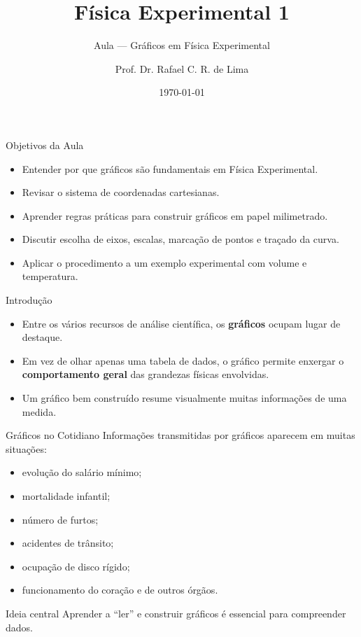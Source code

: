 \documentclass[aspectratio=169]{beamer}
\title[FEX1]{Física Experimental 1}
\subtitle{Aula --- Gráficos em Física Experimental}
\author{Prof. Dr. Rafael C. R. de Lima}
\institute{UDESC --- CCT}
\date{\today}
\begin{document}
\begin{frame}
\titlepage
\end{frame}

\begin{frame}{Objetivos da Aula}
\begin{itemize}
\item Entender por que gráficos são fundamentais em Física Experimental.
\item Revisar o sistema de coordenadas cartesianas.
\item Aprender regras práticas para construir gráficos em papel milimetrado.
\item Discutir escolha de eixos, escalas, marcação de pontos e traçado da curva.
\item Aplicar o procedimento a um exemplo experimental com volume e temperatura.
\end{itemize}
\end{frame}

\begin{frame}{Introdução}
\begin{itemize}
\item Entre os vários recursos de análise científica, os \textbf{gráficos} ocupam lugar de destaque.
\item Em vez de olhar apenas uma tabela de dados, o gráfico permite enxergar o
\textbf{comportamento geral} das grandezas físicas envolvidas.
\item Um gráfico bem construído resume visualmente muitas informações de uma medida.
\end{itemize}
\end{frame}

\begin{frame}{Gráficos no Cotidiano}
Informações transmitidas por gráficos aparecem em muitas situações:

\begin{itemize}
\item evolução do salário mínimo;
\item mortalidade infantil;
\item número de furtos;
\item acidentes de trânsito;
\item ocupação de disco rígido;
\item funcionamento do coração e de outros órgãos.
\end{itemize}

\begin{block}{Ideia central}
Aprender a ``ler'' e construir gráficos é essencial para compreender dados.
\end{block}
\end{frame}
\end{document}
